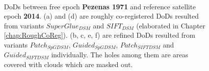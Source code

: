 \begin{figure}[htbp]
\begin{center}
{		}
		\\
		
		\caption{{\ac{DoD}s between free epoch \textbf{Pezenas 1971} and reference satellite epoch \textbf{2014}. (a) and (d) are roughly co-registered \ac{DoD}s resulted from variants $SuperGlue_{DSM}$ and $SIFT_{DSM}$ (elaborated in Chapter \ref{chap:RoughCoReg}). (b, c, e, f) are refined \ac{DoD}s resulted from variants $Patch_{SpGDSM}$, $Guided_{SpGDSM}$, $Patch_{SIFTDSM}$ and $Guided_{SIFTDSM}$ individually. The holes among them are areas covered with clouds which are masked out.}}
		\label{PreciseDoDPezenas-Satellite}
	\end{center}
\end{figure} 


